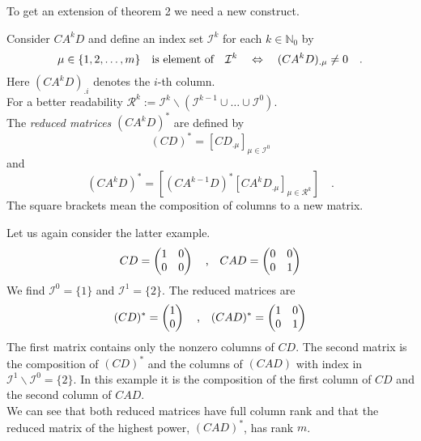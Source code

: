 To get an extension of theorem 2 we need a new construct. 
\begin{definition}{}{}
	Consider $CA^kD$ and define an index set $\mathcal{I}^k$ for each $k\in\mathbb{N}_0$
	by 
	\begin{equation}
	\mu \in\{1,2,\ldots,m\} \quad \text{is element of} \quad \mathcal{I}^k \quad \Leftrightarrow 
	\quad  (CA^kD)_{. \mu} \neq 0  \quad . 
\end{equation}		
	Here $(CA^kD)_{.i}$ denotes the $i$-th column. \\
	
	For a better readability $\mathcal{R}^k:= 
	\mathcal{I}^k\backslash (\mathcal{I}^{k-1}\cup \ldots \cup \mathcal{I}^0)$.\\

	The \textit{reduced matrices} $(CA^kD)^*$ are defined by
	\begin{equation}
	(CD)^* = \left[ CD_{.\mu} \right]_{\mu \in \mathcal{I}^0}
	\end{equation}
	and 
	\begin{equation}
	(CA^kD)^* = \left[ (CA^{k-1}D)^* \left[ CA^kD_{.\mu}  \right]_{\mu\in\mathcal{R}^k} 
	\right]	 \quad .
	\end{equation}
	The square brackets mean the composition of columns to a new matrix.
\end{definition}

\begin{example}{}{}
	Let us again consider the latter example.
	\begin{equation}
	CD = \begin{pmatrix}
	1 & 0 \\ 0 & 0
	\end{pmatrix}
	\quad \text{,} \quad CAD = \begin{pmatrix}
	0 & 0 \\ 0 & 1
	\end{pmatrix} 
	\end{equation}
	We find $\mathcal{I}^0=\{1\}$ and $\mathcal{I}^1 =\{2\}$. The reduced matrices are
	\begin{equation}
	(CD)^* = \begin{pmatrix}
	1 \\ 0
	\end{pmatrix}
	\quad \text{,} \quad 
	(CAD)^* = \begin{pmatrix}
	1 & 0 \\ 0 & 1
	\end{pmatrix}
	\end{equation}
	The first matrix contains only the nonzero columns of $CD$.
	The second matrix is the composition of $(CD)^*$ and the columns of $(CAD)$ with index 
	in $\mathcal{I}^1\backslash\mathcal{I}^0 =\{2\}$. In this example it is the composition 
	of the first column of $CD$ and the second column of $CAD$. \\
	We can see that both reduced matrices have full column rank and that the reduced 
	matrix of the highest power, $(CAD)^*$, has rank $m$. 
\end{example}

